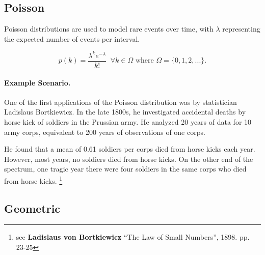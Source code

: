 \subsection{Poisson}
\label{subsec:poisson}
Poisson distributions are used to model rare events over time, with $\lambda$ representing the expected number of events per interval. 

\[p(k) = \frac{\lambda^ke^{-\lambda}}{k!} \;\; \forall k\in\Omega \text{ where } \Omega = \{0,1,2,...\}.\]


\paragraph{Example Scenario.} 
One of the first applications of the Poisson distribution was by statistician Ladislaus Bortkiewicz. 
In the late 1800s, he investigated accidental deaths by horse kick of soldiers in the Prussian army. 
He analyzed 20 years of data for 10 army corps, equivalent to 200 years of observations of one corps.

He found that a mean of 0.61 soldiers per corps died from horse kicks each year. 
However, most years, no soldiers died from horse kicks. 
On the other end of the spectrum, 
one tragic year there were four soldiers in the same corps who died from horse kicks.%
\footnote{see \textbf{Ladislaus von Bortkiewicz} ``The Law of Small Numbers'', 1898. pp. 23-25}

\begin{center}
\end{center}



\subsection{Geometric}

